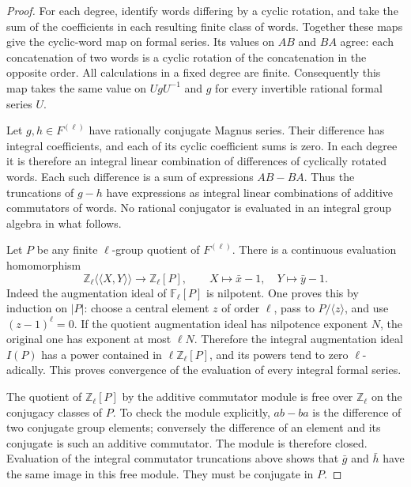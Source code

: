 \begin{proof}
For each degree, identify words differing by a cyclic
rotation, and take the sum of the coefficients in each
resulting finite class of words. Together these maps
give the cyclic-word map on formal series. Its values
on \(AB\) and \(BA\) agree: each concatenation of
two words is a cyclic rotation of the concatenation
in the opposite order. All calculations in a fixed
degree are finite. Consequently this map takes the
same value on \(U g U^{-1}\) and \(g\) for every
invertible rational formal series \(U\).

Let \(g,h\in F^{(\ell)}\) have rationally conjugate
Magnus series. Their difference has integral
coefficients, and each of its cyclic coefficient sums
is zero. In each degree it is therefore an integral
linear combination of differences of cyclically
rotated words. Each such difference is a sum of
expressions \(AB-BA\). Thus the truncations of
\(g-h\) have expressions as integral linear
combinations of additive commutators of words.
No rational conjugator is evaluated in an integral
group algebra in what follows.

Let \(P\) be any finite \(\ell\)-group quotient of
\(F^{(\ell)}\). There is a continuous evaluation
homomorphism
\[
 \mathbb Z_\ell\langle\!\langle X,Y\rangle\!\rangle
       \longrightarrow\mathbb Z_\ell[P],\qquad
 X\longmapsto\bar x-1,\quad Y\longmapsto\bar y-1.
\]
Indeed the augmentation ideal of \(\mathbb F_\ell[P]\)
is nilpotent. One proves this by induction on \(|P|\):
choose a central element \(z\) of order \(\ell\),
pass to \(P/\langle z\rangle\), and use
\((z-1)^\ell=0\). If the quotient augmentation ideal
has nilpotence exponent \(N\), the original one has
exponent at most \(\ell N\). Therefore the integral
augmentation ideal \(I(P)\) has a power contained in
\(\ell\mathbb Z_\ell[P]\), and its powers tend to
zero \(\ell\)-adically. This proves convergence of
the evaluation of every integral formal series.

The quotient of \(\mathbb Z_\ell[P]\) by the additive
commutator module is free over \(\mathbb Z_\ell\)
on the conjugacy classes of \(P\). To check the
module explicitly, \(ab-ba\) is the difference of
two conjugate group elements; conversely the
difference of an element and its conjugate is such
an additive commutator. The module is therefore
closed. Evaluation of the integral commutator
truncations above shows that \(\bar g\) and
\(\bar h\) have the same image in this free module.
They must be conjugate in \(P\).


\end{proof}
